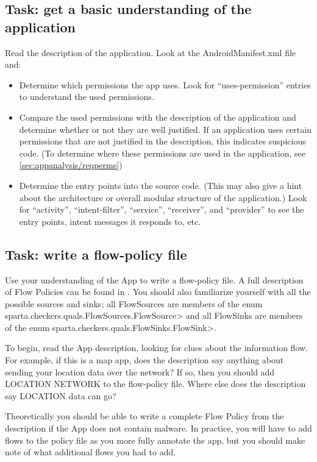 \subsection{Task: get a basic understanding of the application}
Read the description of the application.  
Look at the AndroidManifest.xml file and:
\begin{itemize}
\item Determine which permissions the app uses.
  Look for ``uses-permission'' entries to understand the used
  permissions.
\item Compare the used permissions with the description of the
  application and determine whether or not they are well justified.
  If an application uses certain permissions that are not justified
  in the description, this indicates suspicious code. 
  (To determine where these permissions are used in the application,
   see \ref{sec:appanalysis/reqperms})
\item Determine the entry points into the source code. (This may also give
  a hint about the architecture or overall modular structure of the
  application.)
  Look for ``activity'', ``intent-filter'', ``service'', ``receiver'', and
  ``provider'' to see the entry points, intent messages it responds to,
  etc.
\end{itemize}

\subsection{Task: write a flow-policy file}

Use your understanding of the App to write a flow-policy file.  A full description of Flow Policies can be 
found in .   You should also familiarize yourself with all the possible sources and sinks; 
 all FlowSources  are
members of the enum \<sparta.checkers.quals.FlowSources.FlowSource> and all FlowSinks are
members of the enum \<sparta.checkers.quals.FlowSinks.FlowSink>.

To begin, read the App description, looking for clues about the information flow.  For example,
if this is a map app, does the description say anything about sending your location data over the
 network?  If so, then you should add LOCATION \flowsto{} NETWORK to the flow-policy file.  Where
else does the description say LOCATION data can go?   

Theoretically you should be able to write a complete Flow Policy from the description 
if the App does not contain malware.  In practice, you will have to add flows to the policy file as you
 more fully annotate the app, but you should make note of what additional flows you had to add.
 
